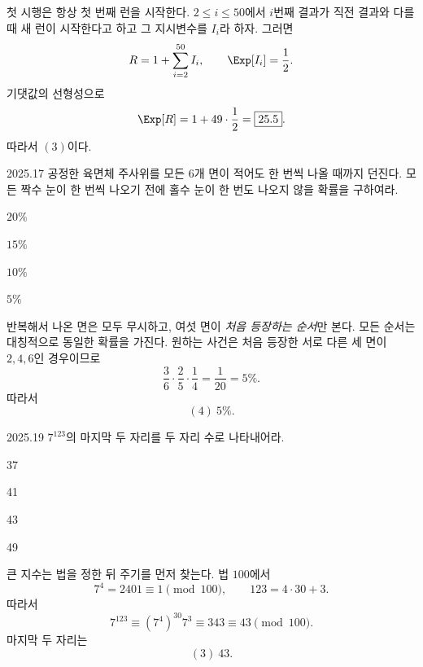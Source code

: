 \begin{solution}
첫 시행은 항상 첫 번째 런을 시작한다. $2\le i\le50$에서 $i$번째 결과가 직전 결과와 다를 때 새 런이 시작한다고 하고 그 지시변수를 $I_i$라 하자. 그러면
\[
R=1+\sum_{i=2}^{50}I_i,
\qquad
\Exp[I_i]=\frac12.
\]
기댓값의 선형성으로
\[
\Exp[R]=1+49\cdot\frac12=\boxed{25.5}.
\]
따라서 $\boxed{(3)}$이다.
\end{solution}

\begin{pastproblem}{2025.17}
공정한 육면체 주사위를 모든 $6$개 면이 적어도 한 번씩 나올 때까지 던진다. 모든 짝수 눈이 한 번씩 나오기 전에 홀수 눈이 한 번도 나오지 않을 확률을 구하여라.
\begin{problemchoices}
\item $20\%$
\item $15\%$
\item $10\%$
\item $5\%$
\end{problemchoices}
\end{pastproblem}

\begin{solution}
반복해서 나온 면은 모두 무시하고, 여섯 면이 \emph{처음 등장하는 순서}만 본다. 모든 순서는 대칭적으로 동일한 확률을 가진다. 원하는 사건은 처음 등장한 서로 다른 세 면이 $2,4,6$인 경우이므로
\[
\frac36\cdot\frac25\cdot\frac14
=\frac1{20}=5\%.
\]
따라서
\[
\boxed{(4)\ 5\%}.
\]
\end{solution}

\begin{pastproblem}{2025.19}
$7^{123}$의 마지막 두 자리를 두 자리 수로 나타내어라.
\begin{problemchoices}
\item 37
\item 41
\item 43
\item 49
\end{problemchoices}
\end{pastproblem}

\begin{solution}
큰 지수는 법을 정한 뒤 주기를 먼저 찾는다. 법 $100$에서
\[
7^4=2401\equiv1\pmod{100},
\qquad
123=4\cdot30+3.
\]
따라서
\[
7^{123}\equiv(7^4)^{30}7^3
\equiv343
\equiv43\pmod{100}.
\]
마지막 두 자리는
\[
\boxed{(3)\ 43}.
\]
\end{solution}
